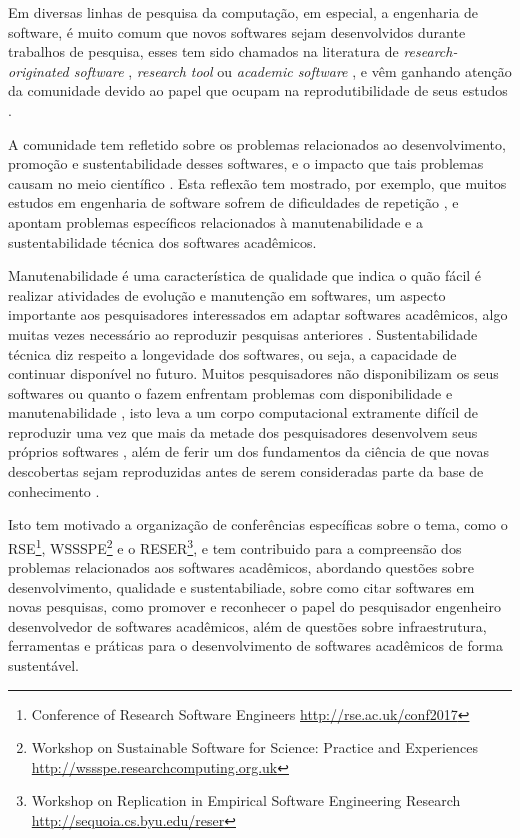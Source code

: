 
Em diversas linhas de pesquisa da computação, em especial, a engenharia de
software, é muito comum que novos softwares sejam desenvolvidos durante
trabalhos de pesquisa, esses tem sido chamados na literatura de {\it
research-originated software} \cite{Kon2011}, {\it research tool}
\cite{Portillo12} ou {\it academic software} \cite{allen2017engineering}, e vêm
ganhando atenção da comunidade devido ao papel que ocupam na reprodutibilidade
de seus estudos \cite{Peng2011}.

A comunidade tem refletido sobre os problemas relacionados ao
desenvolvimento, promoção e sustentabilidade desses softwares, e o
impacto que tais problemas causam no meio científico \cite{allen2017engineering}. Esta
reflexão tem mostrado, por exemplo, que muitos estudos em engenharia de
software sofrem de dificuldades de repetição \cite{Tang2016}, e apontam
problemas específicos relacionados à manutenabilidade e a sustentabilidade
técnica dos softwares acadêmicos.

Manutenabilidade é uma característica de qualidade que indica o quão fácil é
realizar atividades de evolução e manutenção em softwares, um aspecto
importante aos pesquisadores interessados em adaptar softwares acadêmicos, algo
muitas vezes necessário ao reproduzir pesquisas anteriores \cite{Peng2011}.
Sustentabilidade técnica diz respeito a longevidade dos softwares, ou seja, a
capacidade de continuar disponível no futuro. Muitos pesquisadores não
disponibilizam os seus softwares \cite{robles2010replicating,
amann2015software} ou quanto o fazem enfrentam problemas com disponibilidade e
manutenabilidade \cite{Prlic2012}, isto leva a um corpo computacional
extramente difícil de reproduzir uma vez que mais da metade dos pesquisadores
desenvolvem seus próprios softwares \cite{hettrick_2014_14809}, além de ferir um dos
fundamentos da ciência de que novas descobertas sejam reproduzidas antes de
serem consideradas parte da base de conhecimento \cite{Stodden2009}.

Isto tem motivado a organização de conferências específicas sobre o tema, como
o RSE\footnote{Conference of Research Software Engineers
\url{http://rse.ac.uk/conf2017}}, WSSSPE\footnote{Workshop on Sustainable
Software for Science: Practice and Experiences
\url{http://wssspe.researchcomputing.org.uk}} e o RESER\footnote{Workshop on
Replication in Empirical Software Engineering Research
\url{http://sequoia.cs.byu.edu/reser}}, e tem contribuido para a compreensão
dos problemas relacionados aos softwares acadêmicos, abordando questões sobre
desenvolvimento, qualidade e sustentabiliade, sobre como citar softwares em
novas pesquisas, como promover e reconhecer o papel do pesquisador engenheiro
desenvolvedor de softwares acadêmicos, além de questões sobre infraestrutura,
ferramentas e práticas para o desenvolvimento de softwares acadêmicos de
forma sustentável.

